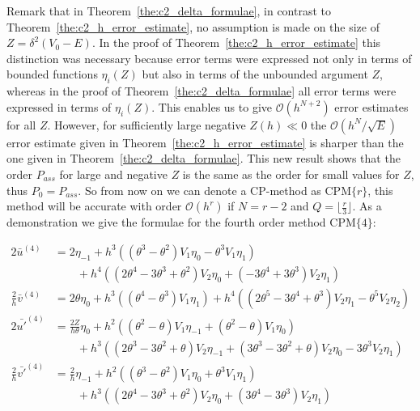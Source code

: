 Remark that in Theorem~\ref{the:c2_delta_formulae}, in contrast to Theorem~\ref{the:c2_h_error_estimate}, no assumption is made on the size of $Z=\delta^2 (V_0-E)$. In the proof of Theorem~\ref{the:c2_h_error_estimate} this distinction was necessary because error terms were expressed
not only in terms of bounded functions $\eta_i(Z)$ but also in terms of the unbounded argument $Z$, whereas in the proof of
Theorem~\ref{the:c2_delta_formulae} all error terms were expressed in terms of $\eta_i(Z)$. This enables us to give $\mathcal{O}(h^{N+2})$ error estimates for all $Z$. However, for sufficiently large negative $Z(h) \ll 0$ the $\mathcal{O}({h^N}/{\sqrt{E}})$ error estimate given in Theorem~\ref{the:c2_h_error_estimate} is sharper than the one given in Theorem~\ref{the:c2_delta_formulae}. This new result shows that the order $P_{ass}$ for large and negative $Z$ is the same as the order for small values for $Z$, thus $P_0 = P_{ass}$. So from now on we can denote a CP-method as $\text{CPM}\{r\}$, this method will be accurate with order $\mathcal{O}(h^r)$ if $N=r-2$ and $Q=\lfloor \frac{r}{3} \rfloor$. As a demonstration we give the formulae for the fourth order method $\text{CPM}\{4\}$:

\begin{align*}
    2\bar{u}^{(4)}            & = 2 \eta_{-1} + h^{3}\left(\left(\theta^{3} - \theta^{2}\right) V_{1} \eta_{0} -\theta^{3} V_{1} \eta_{1}\right)                                                                                                 \\
                              & \quad\quad + h^{4}\left(\left(2 \theta^{4} - 3 \theta^{3} + \theta^{2}\right) V_{2} \eta_{0} + \left(-3 \theta^{4} + 3 \theta^{3}\right) V_{2} \eta_{1}\right)                                                   \\
    \frac{2}{h}\bar{v}^{(4)}  & = 2 \theta \eta_{0} + h^{3}\left(\left(\theta^{4} - \theta^{3}\right) V_{1} \eta_{1}\right) + h^{4}\left(\left(2 \theta^{5} - 3 \theta^{4} + \theta^{3}\right) V_{2} \eta_{1} - \theta^{5} V_{2} \eta_{2}\right) \\
    2\bar{u'}^{(4)}           & = \frac{2Z}{h\theta} \eta_0 + h^{2}\left(\left(\theta^{2} - \theta\right) V_{1} \eta_{-1} + \left(\theta^{2} - \theta\right) V_{1} \eta_{0}\right)                                                               \\
                              & \quad\quad+ h^{3}\left(\left(2 \theta^{3} - 3 \theta^{2} + \theta\right) V_{2} \eta_{-1} + \left(3 \theta^{3} - 3 \theta^{2} + \theta\right) V_{2} \eta_{0} - 3 \theta^{3} V_{2} \eta_{1}\right)                 \\
    \frac{2}{h}\bar{v'}^{(4)} & = \frac{2}{h} \eta_{-1} + h^{2}\left(\left(\theta^{3} - \theta^{2}\right) V_{1} \eta_{0} + \theta^{3} V_{1} \eta_{1}\right)                                                                                      \\
                              & \quad\quad + h^{3}\left(\left(2 \theta^{4} - 3 \theta^{3} + \theta^{2}\right) V_{2} \eta_{0} + \left(3 \theta^{4} - 3 \theta^{3}\right) V_{2} \eta_{1}\right)                                                    \\
\end{align*}%

